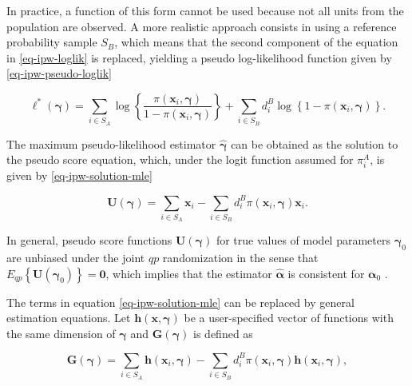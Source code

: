 \documentclass[
]{jss}
\begin{document}
In practice, a function of this form cannot be used because not all
units from the population are observed. A more realistic approach
consists in using a reference probability sample \(S_B\), which means
that the second component of the equation in \eqref{eq-ipw-loglik} is
replaced, yielding a pseudo log-likelihood function given by
\eqref{eq-ipw-pseudo-loglik}

\begin{equation}
\ell^*(\boldsymbol{\gamma}) = \sum_{i \in S_{A}} \log \left\{\frac{\pi\left(\boldsymbol{x}_i, \boldsymbol{\gamma}\right)}{1-\pi\left(\boldsymbol{x}_i, \boldsymbol{\gamma}\right)}\right\}+ \sum_{i \in S_{B}} d_i^B \log \left\{1-\pi\left(\boldsymbol{x}_i, \boldsymbol{\gamma}\right)\right\}.
\label{eq-ipw-pseudo-loglik}
\end{equation}

The maximum pseudo-likelihood estimator \(\hat{\boldsymbol{\gamma}}\)
can be obtained as the solution to the pseudo score equation, which,
under the logit function assumed for \(\pi_i^A\), is given by
\eqref{eq-ipw-solution-mle}

\begin{equation}
\boldsymbol{U}(\boldsymbol{\gamma}) = \sum_{i \in S_A} \boldsymbol{x}_i - \sum_{i \in S_B} d_i^B \pi(\boldsymbol{x}_i, \boldsymbol{\gamma}) \boldsymbol{x}_i.
\label{eq-ipw-solution-mle}
\end{equation}

In general, pseudo score functions
\(\boldsymbol{U}(\boldsymbol{\gamma})\) for true values of model
parameters \(\boldsymbol{\gamma}_0\) are unbiased under the joint
\(q p\) randomization in the sense that
\(E_{q p}\left\{\boldsymbol{U}\left(\boldsymbol{\gamma}_0\right)\right\}=\boldsymbol{0}\),
which implies that the estimator \(\hat{\boldsymbol{\alpha}}\) is
consistent for \(\boldsymbol{\alpha}_0\) \citep{wu2022statistical}.

The terms in equation \eqref{eq-ipw-solution-mle} can be replaced by
general estimation equations. Let
\(\boldsymbol{h}(\boldsymbol{x}, \boldsymbol{\gamma})\) be a
user-specified vector of functions with the same dimension of
\(\boldsymbol{\gamma}\) and \(\boldsymbol{G}(\boldsymbol{\gamma})\) is
defined as

\begin{equation}
\label{gee}
\boldsymbol{G}(\boldsymbol{\gamma})=\sum_{i \in S_A} \boldsymbol{h}\left(\boldsymbol{x}_i, \boldsymbol{\gamma}\right)-\sum_{i \in S_B} d_i^B \pi\left(\boldsymbol{x}_i, \boldsymbol{\gamma}\right) \boldsymbol{h}\left(\boldsymbol{x}_i, \boldsymbol{\gamma}\right),
\end{equation}
\end{document}
